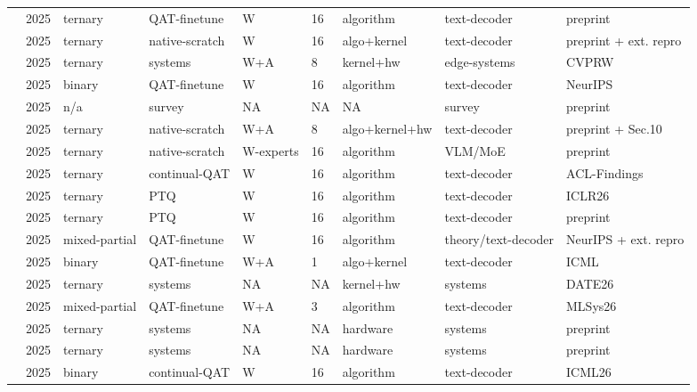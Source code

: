 \begin{landscape}
\begin{longtable}{p{3.2cm} p{1cm} p{1.9cm} p{2.2cm} p{2.2cm} p{1.3cm} p{2.2cm} p{2.1cm} p{2.5cm}}
\citet{Huang2025-Tequila} & 2025 & ternary & QAT-finetune & W & 16 & algorithm & text-decoder & preprint \\
\citet{Vaidhya2025-Spectra11} & 2025 & ternary & native-scratch & W & 16 & algo+\allowbreak{}kernel & text-decoder & preprint +\allowbreak{} ext. repro \\
\citet{Ardakani2025-LLMPi} & 2025 & ternary & systems & W+\allowbreak{}A & 8 & kernel+\allowbreak{}hw & edge-systems & CVPRW \\
\citet{Lee2025-LittleBit} & 2025 & binary & QAT-finetune & W & 16 & algorithm & text-decoder & Neur\allowbreak{}IPS \\
\citet{Liu2025-SurveyBNNLLM} & 2025 & n/\allowbreak{}a & survey & NA & NA & NA & survey & preprint \\
\citet{Ma2025-BitNet2B4T} & 2025 & ternary & native-scratch & W+\allowbreak{}A & 8 & algo+\allowbreak{}kernel+\allowbreak{}hw & text-decoder & preprint +\allowbreak{} Sec.10 \\
\citet{Wang2025-MoTE} & 2025 & ternary & native-scratch & W-experts & 16 & algorithm & VLM/\allowbreak{}Mo\allowbreak{}E & preprint \\
\citet{Nielsen2025-ContinualQAT} & 2025 & ternary & continual-QAT & W & 16 & algorithm & text-decoder & ACL-Findings \\
\citet{Yan2025-PT2LLM} & 2025 & ternary & PTQ & W & 16 & algorithm & text-decoder & ICLR26 \\
\citet{Xiao2025-PTQTP} & 2025 & ternary & PTQ & W & 16 & algorithm & text-decoder & preprint \\
\citet{Liu2025-ParetoQ} & 2025 & mixed-partial & QAT-finetune & W & 16 & algorithm & theory/\allowbreak{}text-decoder & Neur\allowbreak{}IPS +\allowbreak{} ext. repro \\
\citet{Panferov2025-QuEST} & 2025 & binary & QAT-finetune & W+\allowbreak{}A & 1 & algo+\allowbreak{}kernel & text-decoder & ICML \\
\citet{Oh2025-TSAR} & 2025 & ternary & systems & NA & NA & kernel+\allowbreak{}hw & systems & DATE26 \\
\citet{Tabesh2025-CAGE} & 2025 & mixed-partial & QAT-finetune & W+\allowbreak{}A & 3 & algorithm & text-decoder & MLSys26 \\
\citet{Xu2025-TeLLMe} & 2025 & ternary & systems & NA & NA & hardware & systems & preprint \\
\citet{Chen2025-TerEffic} & 2025 & ternary & systems & NA & NA & hardware & systems & preprint \\
\citet{Tu2025-Rethink1bitOpt} & 2025 & binary & continual-QAT & W & 16 & algorithm & text-decoder & ICML26 \\

\end{longtable}
\end{landscape}
